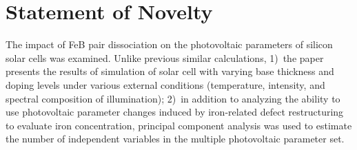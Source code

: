 \documentclass[preprint]{elsarticle}
\begin{document}
\section*{Statement of Novelty}

The impact of FeB pair dissociation on the photovoltaic parameters of silicon solar cells was examined.
Unlike previous similar calculations, 
1)~the paper presents the results of
simulation of solar cell with varying base thickness and doping levels
under various external conditions (temperature, intensity, and spectral composition of illumination);
2)~in addition to analyzing the ability to use photovoltaic parameter changes induced by iron-related defect 
restructuring to evaluate iron concentration, 
principal component analysis was used to estimate the number of independent variables in the multiple photovoltaic parameter set.
\end{document}
